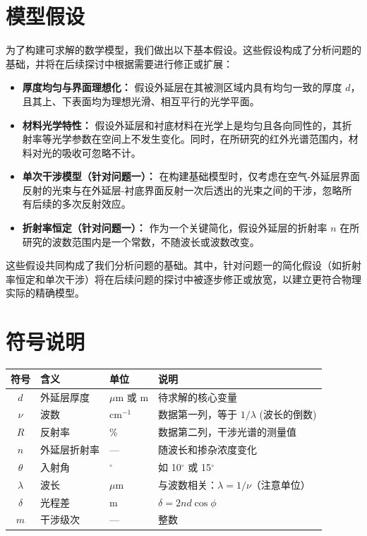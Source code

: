 \documentclass[withoutpreface,bwprint]{cumcmthesis} %
\begin{document}
\section{模型假设}

为了构建可求解的数学模型，我们做出以下基本假设。这些假设构成了分析问题的基础，并将在后续探讨中根据需要进行修正或扩展：

\begin{itemize}
    \item \textbf{厚度均匀与界面理想化：} 假设外延层在其被测区域内具有均匀一致的厚度 $d$，且其上、下表面均为理想光滑、相互平行的光学平面。
    \item \textbf{材料光学特性：} 假设外延层和衬底材料在光学上是均匀且各向同性的，其折射率等光学参数在空间上不发生变化。同时，在所研究的红外光谱范围内，材料对光的吸收可忽略不计。
    \item \textbf{单次干涉模型（针对问题一）：} 在构建基础模型时，仅考虑在空气-外延层界面反射的光束与在外延层-衬底界面反射一次后透出的光束之间的干涉，忽略所有后续的多次反射效应。
    \item \textbf{折射率恒定（针对问题一）：} 作为一个关键简化，假设外延层的折射率 $n$ 在所研究的波数范围内是一个常数，不随波长或波数改变。
\end{itemize}
这些假设共同构成了我们分析问题的基础。其中，针对问题一的简化假设（如折射率恒定和单次干涉）将在后续问题的探讨中被逐步修正或放宽，以建立更符合物理实际的精确模型。

\section{符号说明}

\begin{center}
    \begin{tabular}{clll}
        \toprule
        符号        & 含义     & 单位         & 说明                            \\
        \midrule
        $d$       & 外延层厚度  & $\mu$m 或 m & 待求解的核心变量                      \\
        $\nu$     & 波数     & cm$^{-1}$  & 数据第一列，等于 $1/\lambda$ (波长的倒数)  \\
        $R$       & 反射率    & \%         & 数据第二列，干涉光谱的测量值                \\
        $n$       & 外延层折射率 & —          & 随波长和掺杂浓度变化                    \\
        $\theta$  & 入射角    & $^\circ$   & 如 10$^\circ$ 或 15$^\circ$     \\
        $\lambda$ & 波长     & $\mu$m     & 与波数相关：$\lambda = 1/\nu$（注意单位） \\
        $\delta$  & 光程差    & m          & $\delta = 2 n d \cos \phi$    \\
        $m$       & 干涉级次   & —          & 整数                            \\
        \bottomrule
    \end{tabular}
\end{center}
\end{document}
